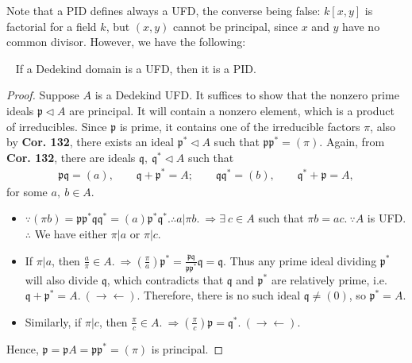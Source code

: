 \documentclass[12pt,a4paper,footinclude=true,headinclude=true]{scrbook} %
\newenvironment{proposition}[2][]
{\renewcommand\theinnercustomprop{#2}\innercustomprop[#1] 
\begin{mdframed}[backgroundcolor=gray!20]\ }
{\end{mdframed}\endinnercustomprop}
\begin{document}
Note that a PID defines always a UFD, the converse being false: $k[x,y]$ is factorial for a field $k$, but $(x,y)$ cannot be principal, since $x$ and $y$ have no common divisor. However, we have the following:
\begin{proposition}{142}
    If a Dedekind domain is a UFD, then it is a PID.
\end{proposition}
\begin{proof}
    Suppose $A$ is a Dedekind UFD. It suffices to show that the nonzero prime ideals $\mathfrak{p}\triangleleft A$ are principal. It will contain a nonzero element, which is a product of irreducibles. Since $\mathfrak{p}$ is prime, it contains one of the irreducible factors $\pi$, also by \textbf{Cor. 132}, there exists an ideal $\mathfrak{p}^\ast\triangleleft A$ such that $\mathfrak{p}\mathfrak{p}^\ast=(\pi)$. 
    Again, from \textbf{Cor. 132}, there are ideals $\mathfrak{q},\ \mathfrak{q}^\ast \triangleleft A$ such that 
    \begin{align*}
        \mathfrak{p}\mathfrak{q}=(a),\qquad \mathfrak{q}+\mathfrak{p}^\ast=A;
        \qquad \mathfrak{q}\mathfrak{q}^\ast=(b),\qquad \mathfrak{q}^\ast+\mathfrak{p}=A,
    \end{align*}
    for some $a,\ b\in A$. 
    \begin{itemize}
        \item $\because(\pi b)=\mathfrak{p}\mathfrak{p}^\ast\mathfrak{q} \mathfrak{q}^\ast=(a)\mathfrak{p}^\ast\mathfrak{q}^\ast. \therefore a|\pi b.\ \Rightarrow \exists\ c\in A$ such that $\pi b=ac.\ \because A$ is UFD. $\therefore$ We have either $\pi|a$ or $\pi|c$.
        \item If $\pi|a$, then $\frac{a}{\pi}\in A.\ \Rightarrow (\frac{\pi}{a})\mathfrak{p}^\ast=\frac{\mathfrak{p}\mathfrak{q}}{\mathfrak{p}\mathfrak{p}^\ast}\mathfrak{q}=\mathfrak{q}$. Thus any prime ideal dividing $\mathfrak{p}^\ast$ will also divide $\mathfrak{q}$, which contradicts that $\mathfrak{q}$ and $\mathfrak{p}^\ast$ are relatively prime, i.e. $\mathfrak{q}+\mathfrak{p}^\ast =A.\ (\to\gets)$. Therefore, there is no such ideal $\mathfrak{q}\neq(0)$, so $\mathfrak{p}^\ast=A$.
        \item Similarly, if $\pi|c$, then $\frac{\pi}{c}\in A.\ \Rightarrow (\frac{\pi}{c})\mathfrak{p}=\mathfrak{q}^\ast.\ (\to\gets)$. 
    \end{itemize}
    Hence, $\mathfrak{p}=\mathfrak{p}A=\mathfrak{p}\mathfrak{p}^\ast=(\pi)$ is principal.
\end{proof}
\end{document}

